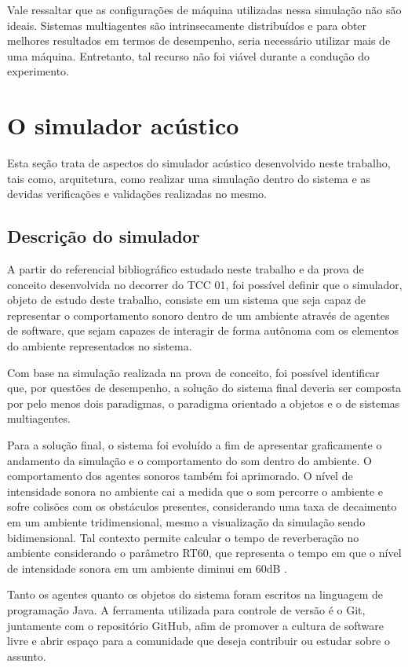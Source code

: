 Vale ressaltar que as configurações de máquina utilizadas nessa simulação não são ideais. Sistemas multiagentes são intrinsecamente distribuídos e para obter melhores resultados em termos de desempenho, seria necessário utilizar mais de uma máquina. Entretanto, tal recurso não foi viável durante a condução do experimento.


\section[O simulador acústico]{O simulador acústico}

Esta seção trata de aspectos do simulador acústico desenvolvido neste trabalho, tais como, arquitetura, como realizar uma simulação dentro do sistema e as devidas verificações e validações realizadas no mesmo.

\subsection{Descrição do simulador}

A partir do referencial bibliográfico estudado neste trabalho e da prova de conceito desenvolvida no decorrer do TCC 01, foi possível definir que o simulador, objeto de estudo deste trabalho, consiste em um sistema que seja capaz de representar o comportamento sonoro dentro de um ambiente através de agentes de software, que sejam capazes de interagir de forma autônoma com os elementos do ambiente representados no sistema.

Com base na simulação realizada na prova de conceito, foi possível identificar que, por questões de desempenho, a solução do sistema final deveria ser composta por pelo menos dois paradigmas, o paradigma orientado a objetos e o de sistemas multiagentes.

Para a solução final, o sistema foi evoluído a fim de apresentar graficamente o andamento da simulação e o comportamento do som dentro do ambiente. O comportamento dos agentes sonoros também foi aprimorado. O nível de intensidade sonora no ambiente cai a medida que o som percorre o ambiente e sofre colisões com os obstáculos presentes, considerando uma taxa de decaimento em um ambiente tridimensional, mesmo a visualização da simulação sendo bidimensional. Tal contexto permite calcular o tempo de reverberação no ambiente considerando o parâmetro RT60, que representa o tempo em que o nível de intensidade sonora em um ambiente diminui em 60dB \cite{loschi}.

Tanto os agentes quanto os objetos do sistema foram escritos na linguagem de programação Java. A ferramenta utilizada para controle de versão é o Git, juntamente com o repositório GitHub, afim de promover a cultura de software livre e abrir espaço para a comunidade que deseja contribuir ou estudar sobre o assunto.

